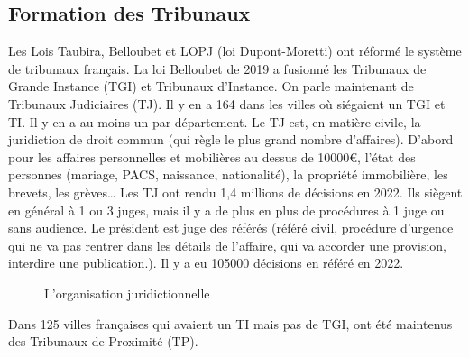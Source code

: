 \documentclass[math]{cours}
\begin{document}
\subsection{Formation des Tribunaux}
	Les Lois Taubira, Belloubet et LOPJ (loi Dupont-Moretti) ont réformé le système de tribunaux français.
	La loi Belloubet de 2019 a fusionné les Tribunaux de Grande Instance (TGI) et Tribunaux d'Instance.
	On parle maintenant de Tribunaux Judiciaires (TJ). Il y en a 164 dans les villes où siégaient un TGI et TI.
	Il y en a au moins un par département.
	Le TJ est, en matière civile, la juridiction de droit commun (qui règle le plus grand nombre d'affaires).
	D'abord pour les affaires personnelles et mobilières au dessus de 10000€, l'état des personnes (mariage, PACS, naissance, nationalité), la propriété immobilière, les brevets, les grèves\ldots
	Les TJ ont rendu 1,4 millions de décisions en 2022.
	Ils siègent en général à 1 ou 3 juges, mais il y a de plus en plus de procédures à 1 juge ou sans audience.
	Le président est juge des référés (référé civil, procédure d'urgence qui ne va pas rentrer dans les détails de l'affaire, qui va accorder une provision, interdire une publication.). Il y a eu 105000 décisions en référé en 2022.
\begin{figure}[h]
	\centering
	\caption{L'organisation juridictionnelle}
	\label{fig:orga_juridictionnelle}
\end{figure}
	Dans 125 villes françaises qui avaient un TI mais pas de TGI, ont été maintenus des Tribunaux de Proximité (TP).
\end{document}
